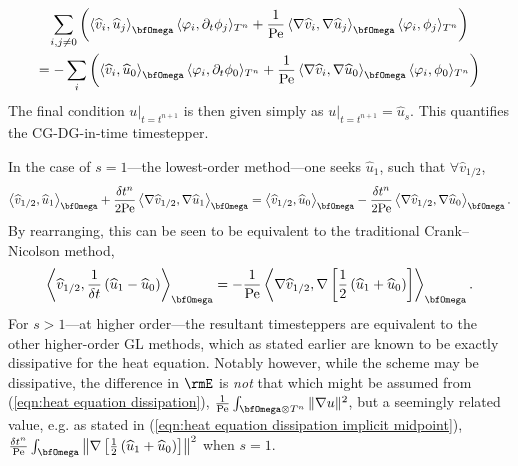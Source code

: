\begin{example}
\begin{align}
        \end{align}
        \vspace{-8mm}
        \begin{multline}
            \sum_{i, j \neq 0}\left(\left\langle\widehat{v}_{i}, \widehat{u}_{j}\right\rangle_{\bfOmega}\langle\varphi_{i}, \partial_{t}\phi_{j}\rangle_{T^{n}} + \frac{1}{\rmPe}\left\langle\nabla\widehat{v}_{i}, \nabla\widehat{u}_{j}\right\rangle_{\bfOmega}\langle\varphi_{i}, \phi_{j}\rangle_{T^{n}}\right)  \\
            =  - \sum_{i}\left(\left\langle\widehat{v}_{i}, \widehat{u}_{0}\right\rangle_{\bfOmega}\langle\varphi_{i}, \partial_{t}\phi_{0}\rangle_{T^{n}} + \frac{1}{\rmPe}\left\langle\nabla\widehat{v}_{i}, \nabla\widehat{u}_{0}\right\rangle_{\bfOmega}\langle\varphi_{i}, \phi_{0}\rangle_{T^{n}}\right)
        \end{multline}
        The final condition $u|_{t = t^{n + 1}}$ is then given simply as $u|_{t = t^{n + 1}}  =  \widehat{u}_{s}$. This quantifies the CG-DG-in-time timestepper.

        In the case of $s  =  1$---the lowest-order method---one seeks $\widehat{u}_{1}$, such that $\forall \widehat{v}_{1/2}$,
        \begin{equation}
            \left\langle\widehat{v}_{1/2}, \widehat{u}_{1}\right\rangle_{\bfOmega} + \frac{\delta t^{n}}{2\rmPe}\left\langle\nabla\widehat{v}_{1/2}, \nabla\widehat{u}_{1}\right\rangle_{\bfOmega}  =  \left\langle\widehat{v}_{1/2}, \widehat{u}_{0}\right\rangle_{\bfOmega} - \frac{\delta t^{n}}{2\rmPe}\left\langle\nabla\widehat{v}_{1/2}, \nabla\widehat{u}_{0}\right\rangle_{\bfOmega}.
        \end{equation}
        By rearranging, this can be seen to be equivalent to the traditional Crank--Nicolson method,
        \begin{equation}
            \left\langle\widehat{v}_{1/2}, \frac{1}{\delta t}\left(\widehat{u}_{1} - \widehat{u}_{0}\right)\right\rangle_{\bfOmega}  =  - \frac{1}{\rmPe}\left\langle\nabla\widehat{v}_{1/2}, \nabla\left[\frac{1}{2}\left(\widehat{u}_{1} + \widehat{u}_{0}\right)\right]\right\rangle_{\bfOmega}.
        \end{equation}
        For $s  >  1$---at higher order---the resultant timesteppers are equivalent to the other higher-order GL methods, which as stated earlier are known to be exactly dissipative for the heat equation. Notably however, while the scheme may be dissipative, the difference in $\rmE$ is \emph{not} that which might be assumed from (\ref{eqn:heat equation dissipation}), $\frac{1}{\rmPe}\int_{\bfOmega\otimes T^{n}}\|\nabla u\|^{2}$, but a seemingly related value, e.g. as stated in (\ref{eqn:heat equation dissipation implicit midpoint}), $\frac{\delta t^{n}}{\rmPe}\int_{\bfOmega}\left\|\nabla\left[\frac{1}{2}\left(\widehat{u}_{1} + \widehat{u}_{0}\right)\right]\right\|^{2}$ when $s = 1$.
    \end{example}